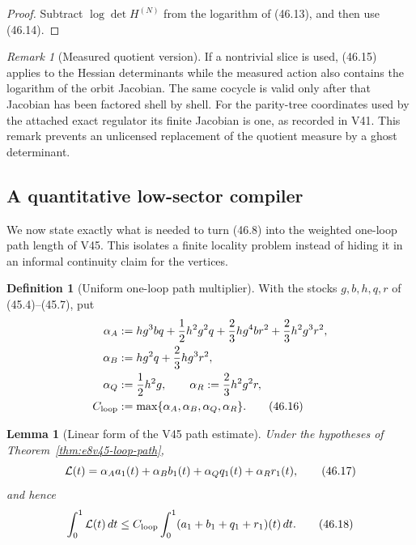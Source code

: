 \documentclass[11pt,oneside]{book}
\newtheorem{lemma}[theorem]{Lemma}
\theoremstyle{definition}
\newtheorem{definition}[theorem]{Definition}
\theoremstyle{remark}
\newtheorem{remark}[theorem]{Remark}
\begin{document}
\begin{proof}
Subtract \(\log\det H^{(N)}\) from the logarithm of (46.13), and
then use (46.14).
\end{proof}

\begin{remark}[Measured quotient version]
\label{rem:e8v46-measured-cocycle}
If a nontrivial slice is used, (46.15) applies to the Hessian
determinants while the measured action also contains the logarithm
of the orbit Jacobian.  The same cocycle is valid only after that
Jacobian has been factored shell by shell.  For the parity-tree
coordinates used by the attached exact regulator its finite
Jacobian is one, as recorded in V41.  This remark prevents an
unlicensed replacement of the quotient measure by a ghost
determinant.
\end{remark}

\subsection{A quantitative low-sector compiler}

We now state exactly what is needed to turn (46.8) into the
weighted one-loop path length of V45.  This isolates a finite
locality problem instead of hiding it in an informal continuity
claim for the vertices.

\begin{definition}[Uniform one-loop path multiplier]
\label{def:e8v46-loop-multiplier}
With the stocks \(g,b,h,q,r\) of (45.4)--(45.7), put
\[
\begin{split}
 \alpha_A&:=hg^3bq+\frac12h^2g^2q
       +\frac23hg^4br^2+\frac23h^2g^3r^2,\\
 \alpha_B&:=hg^2q+\frac23hg^3r^2,\\
 \alpha_Q&:=\frac12h^2g,\qquad
 \alpha_R:=\frac23h^2g^2r,\\
 C_{\rm loop}&:=\max\{\alpha_A,\alpha_B,\alpha_Q,\alpha_R\}.
                                                                    \tag{46.16}
\end{split}
\]
\end{definition}

\begin{lemma}[Linear form of the V45 path estimate]
\label{lem:e8v46-linear-loop}
Under the hypotheses of
Theorem~\ref{thm:e8v45-loop-path},
\[
 {\cal L}(t)
 =\alpha_Aa_1(t)+\alpha_Bb_1(t)
  +\alpha_Qq_1(t)+\alpha_Rr_1(t),                              \tag{46.17}
\]
and hence
\[
 \int_0^1{\cal L}(t)\,dt
 \le C_{\rm loop}\int_0^1
 (a_1+b_1+q_1+r_1)(t)\,dt.                                    \tag{46.18}
\]
\end{lemma}
\end{document}
